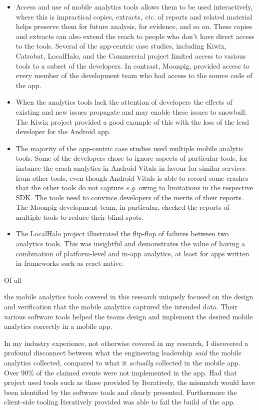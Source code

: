 \begin{itemize}
    \itemsep0em
    \item Access and use of mobile analytics tools allows them to be used interactively, where this is impractical copies, extracts, \emph{etc.} of reports and related material helps  preserve them for future analysis, for evidence, and so on. These copies and extracts can also extend the reach to people who don't have direct access to the tools. Several of the app-centric case studies, including Kiwix, Catrobat, LocalHalo, and the Commercial project limited access to various tools to a subset of the developers. In contrast, Moonpig, provided access to every member of the development team who had access to the source code of the app.
    \item When the analytics tools lack the attention of developers the effects of existing and new issues propagate and may enable these issues to snowball. The Kiwix project provided a good example of this with the loss of the lead developer for the Android app.
    \item The majority of the app-centric case studies used multiple mobile analytic tools. Some of the developers chose to ignore aspects of particular tools, for instance the crash analytics in Android Vitals in favour for similar services from other tools, even though Android Vitals is able to record some crashes that the other tools do not capture \emph{e.g.} owing to limitations in the respective SDK. The tools need to convince developers of the merits of their reports. The Moonpig development team, in particular, checked the reports of multiple tools to reduce their blind-spots.
    \item The LocalHalo project illustrated the flip-flop of failures between two analytics tools. This was insightful and demonstrates the value of having a combination of platform-level and in-app analytics, at least for apps written in frameworks such as react-native.
\end{itemize}

\hypertarget{tata-design-of-mobile-analytics-events-and-content}{Of all} the mobile analytics tools covered in this research  uniquely focused on the design and verification that the mobile analytics captured the intended data. Their various software tools helped the teams design and implement the desired mobile analytics correctly in a mobile app.

\begin{kaobox}[frametitle=Industrial example of a major disconnect between perception and reality]
In my industry experience, not otherwise covered in my research, I discovered a profound disconnect between what the engineering leadership \emph{said} the mobile analytics collected, compared to what it \emph{actually} collected in the mobile app. Over 90\% of the claimed events were not implemented in the app. Had that project used tools such as those provided by Iteratively, the mismatch would have been identified by the software tools and clearly presented. Furthermore the client-side tooling Iteratively provided was able to fail the build of the app. 
\end{kaobox}


